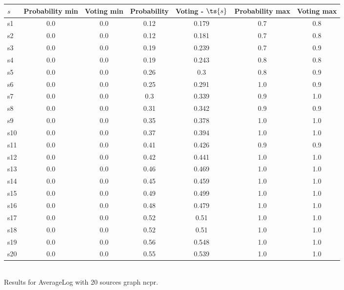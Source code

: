 \documentclass{article}
\begin{document}
\noindent\begin{tabular}{|l|c|c|c|c|c|c|}
\hline
$s$& Probability min & Voting min & Probability & Voting - $\ts{s}$ & Probability max & Voting max\\
\hline
s1 &0.0 & 0.0 & 0.12 & 0.179 & 0.7 & 0.8\\
\hline
s2 &0.0 & 0.0 & 0.12 & 0.181 & 0.7 & 0.8\\
\hline
s3 &0.0 & 0.0 & 0.19 & 0.239 & 0.7 & 0.9\\
\hline
s4 &0.0 & 0.0 & 0.19 & 0.243 & 0.8 & 0.8\\
\hline
s5 &0.0 & 0.0 & 0.26 & 0.3 & 0.8 & 0.9\\
\hline
s6 &0.0 & 0.0 & 0.25 & 0.291 & 1.0 & 0.9\\
\hline
s7 &0.0 & 0.0 & 0.3 & 0.339 & 0.9 & 1.0\\
\hline
s8 &0.0 & 0.0 & 0.31 & 0.342 & 0.9 & 0.9\\
\hline
s9 &0.0 & 0.0 & 0.35 & 0.378 & 1.0 & 1.0\\
\hline
s10 &0.0 & 0.0 & 0.37 & 0.394 & 1.0 & 1.0\\
\hline
s11 &0.0 & 0.0 & 0.41 & 0.426 & 0.9 & 0.9\\
\hline
s12 &0.0 & 0.0 & 0.42 & 0.441 & 1.0 & 1.0\\
\hline
s13 &0.0 & 0.0 & 0.46 & 0.469 & 1.0 & 1.0\\
\hline
s14 &0.0 & 0.0 & 0.45 & 0.459 & 1.0 & 1.0\\
\hline
s15 &0.0 & 0.0 & 0.49 & 0.499 & 1.0 & 1.0\\
\hline
s16 &0.0 & 0.0 & 0.48 & 0.479 & 1.0 & 1.0\\
\hline
s17 &0.0 & 0.0 & 0.52 & 0.51 & 1.0 & 1.0\\
\hline
s18 &0.0 & 0.0 & 0.52 & 0.51 & 1.0 & 1.0\\
\hline
s19 &0.0 & 0.0 & 0.56 & 0.548 & 1.0 & 1.0\\
\hline
s20 &0.0 & 0.0 & 0.55 & 0.539 & 1.0 & 1.0\\
\hline
\end{tabular}\\

\noindent Results for AverageLog with 20 sources graph ncpr.
\end{document}
